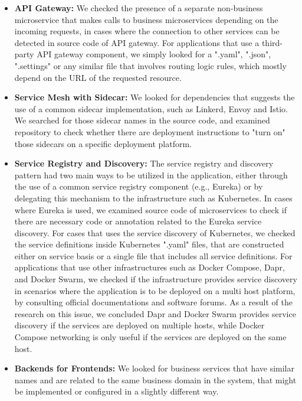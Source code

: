 \documentclass{Configuration_Files/PoliMi3i_thesis}
\begin{document}
\begin{itemize}
    \item \textbf{API Gateway:} We checked the presence of a separate non-business microservice that makes calls to business microservices depending on the incoming requests, in cases where the connection to other services can be detected in source code of API gateway.
    For applications that use a third-party API gateway component, we simply looked for a ".yaml", ".json", ".settings" or any similar file that involves routing logic rules, which mostly depend on the URL of the requested resource.
    
    \item \textbf{Service Mesh with Sidecar:} We looked for dependencies that suggests the use of a common sidecar implementation, such as Linkerd, Envoy and Istio.
    We searched for those sidecar names in the source code, and examined repository to check whether there are deployment instructions to "turn on" those sidecars on a specific deployment platform.
    
    \item \textbf{Service Registry and Discovery:} The service registry and discovery pattern had two main ways to be utilized in the application, either through the use of a common service registry component (e.g., Eureka) or by delegating this mechanism to the infrastructure such as Kubernetes.
    In cases where Eureka is used, we examined source code of microservices to check if there are necessary code or annotation related to the Eureka service discovery.
    For cases that uses the service discovery of Kubernetes, we checked the service definitions inside Kubernetes ".yaml" files, that are constructed either on service basis or a single file that includes all service definitions.
    For applications that use other infrastructures such as Docker Compose, Dapr, and Docker Swarm, we checked if the infrastructure provides service discovery in scenarios where the application is to be deployed on a multi host platform, by consulting official documentations and software forums.
    As a result of the research on this issue, we concluded Dapr and Docker Swarm provides service discovery if the services are deployed on multiple hosts, while Docker Compose networking is only useful if the services are deployed on the same host.
    
    \item \textbf{Backends for Frontends:} We looked for business services that have similar names and are related to the same business domain in the system, that might be implemented or configured in a slightly different way.
    

\end{itemize}
\end{document}
